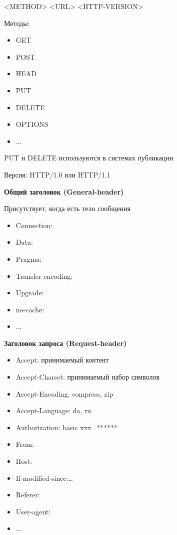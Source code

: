 
<METHOD> <URL> <HTTP-VERSION> 

Методы:
\begin{itemize}
    \item GET
    \item POST
    \item HEAD
    \item PUT
    \item DELETE
    \item OPTIONS
    \item ...
\end{itemize}

PUT и DELETE используются в системах публикации

Версия: HTTP/1.0 или HTTP/1.1



{\bf Общий заголовок (General-header)}

Присутствует, когда есть тело сообщения

\begin{itemize}
    \item Connection:
    \item Data:
    \item Pragma:
    \item Transfer-encoding:
    \item Upgrade:
    \item no-cache:
    \item ...
\end{itemize}

{\bf Заголовок запроса (Request-header)}

\begin{itemize}
    \item Accept: принимаемый контент
    \item Accept-Charset: принимаемый набор символов
    \item Accept-Encoding: compress, zip
    \item Accept-Language: da, ru
    \item Authorization: basic xxx=******
    \item From:
    \item Host:
    \item If-modified-since:…
    \item Referer:
    \item User-agent:
    \item ...
\end{itemize}

